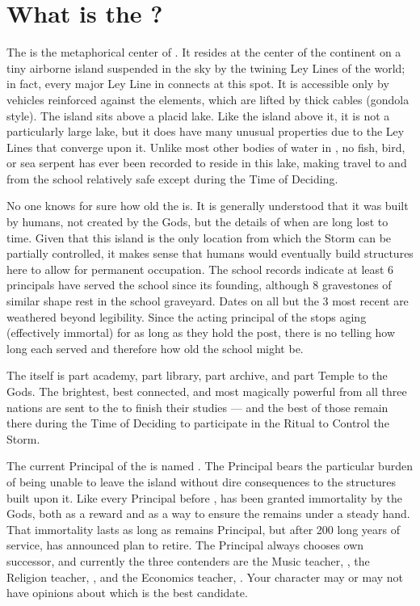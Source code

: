 \documentclass[blue]{GL2020}
\begin{document}
\name{\bSchool{}}

\section*{What is the \pSchool{}?}
The \pSchool{} is the metaphorical center of \pEarth{}. It resides at the center of the continent on a tiny airborne island suspended in the sky by the twining Ley Lines of the world; in fact, every major Ley Line in \pEarth{} connects at this spot. It is accessible only by vehicles reinforced against the elements, which are lifted by thick cables (gondola style). The island sits above a placid lake. Like the island above it, it is not a particularly large lake, but it does have many unusual properties due to the Ley Lines that converge upon it. Unlike most other bodies of water in \pEarth{}, no fish, bird, or sea serpent has ever been recorded to reside in this lake, making travel to and from the school relatively safe except during the Time of Deciding.

No one knows for sure how old the \pSchool{} is. It is generally understood that it was built by humans, not created by the Gods, but the details of when are long lost to time. Given that this island is the only location from which the Storm can be partially controlled, it makes sense that humans would eventually build structures here to allow for permanent occupation. The school records indicate at least 6 principals have served the school since its founding, although 8 gravestones of similar shape rest in the school graveyard. Dates on all but the 3 most recent are weathered beyond legibility. Since the acting principal of the \pSc{} stops aging (effectively immortal) for as long as they hold the post, there is no telling how long each served and therefore how old the school might be.

The \pSc{} itself is part academy, part library, part archive, and part Temple to the Gods. The brightest, best connected, and most magically powerful from all three nations are sent to the \pSchool{} to finish their studies — and the best of those remain there during the Time of Deciding to participate in the Ritual to Control the Storm.

The current Principal of the \pSc{} is named \cPrincipal{\full}. The Principal bears the particular burden of being unable to leave the island without dire consequences to the structures built upon it. Like every Principal before \cPrincipal{\them}, \cPrincipal{} has been granted immortality by the Gods, both as a reward and as a way to ensure the \pSc{} remains under a steady hand. That immortality lasts as long as \cPrincipal{} remains Principal, but after 200 long years of service, \cPrincipal{\they} has announced \cPrincipal{\their} plan to retire. The Principal always chooses \cPrincipal{\their} own successor, and currently the three contenders are the Music teacher, \cMusic{\full}, the Religion teacher, \cBeetle{\full}, and the Economics teacher, \cChupSecond{\full}. Your character may or may not have opinions about which is the best candidate.
\end{document}
